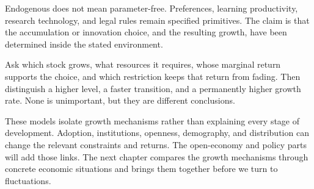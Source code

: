 Endogenous does not mean parameter-free. Preferences, learning productivity,
research technology, and legal rules remain specified primitives. The claim
is that the accumulation or innovation choice, and the resulting growth,
have been determined inside the stated environment.

Ask which stock grows, what resources it requires, whose marginal return
supports the choice, and which restriction keeps that return from fading.
Then distinguish a higher level, a faster transition, and a permanently higher
growth rate. None is unimportant, but they are different conclusions.

These models isolate growth mechanisms rather than explaining every stage
of development. Adoption, institutions, openness, demography, and distribution
can change the relevant constraints and returns. The open-economy and policy
parts will add those links. The next chapter compares the growth mechanisms
through concrete economic situations and brings them together before we turn
to fluctuations.
